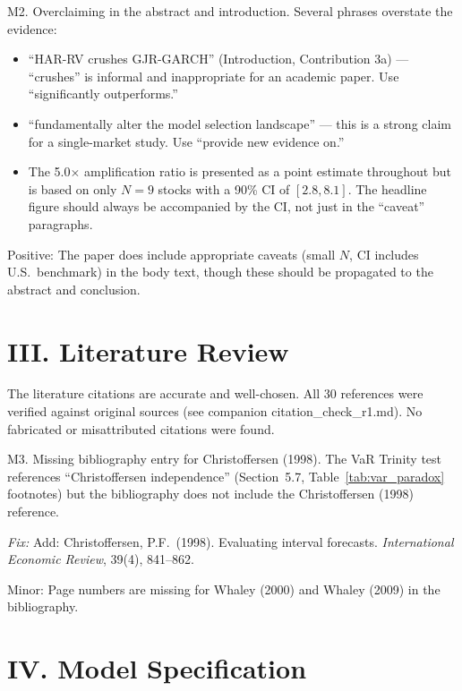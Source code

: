 \documentclass[12pt,a4paper]{article}
\begin{document}
\textcolor{warncolor}{M2. Overclaiming in the abstract and introduction.} Several phrases overstate the evidence:
\begin{itemize}[nosep]
\item ``HAR-RV crushes GJR-GARCH'' (Introduction, Contribution 3a) --- ``crushes'' is informal and inappropriate for an academic paper. Use ``significantly outperforms.''
\item ``fundamentally alter the model selection landscape'' --- this is a strong claim for a single-market study. Use ``provide new evidence on.''
\item The 5.0$\times$ amplification ratio is presented as a point estimate throughout but is based on only $N=9$ stocks with a 90\% CI of $[2.8, 8.1]$. The headline figure should always be accompanied by the CI, not just in the ``caveat'' paragraphs.
\end{itemize}

\textcolor{okgreen}{Positive:} The paper does include appropriate caveats (small $N$, CI includes U.S.\ benchmark) in the body text, though these should be propagated to the abstract and conclusion.


\section*{III. Literature Review}

The literature citations are accurate and well-chosen. All 30 references were verified against original sources (see companion citation\_check\_r1.md). No fabricated or misattributed citations were found.

\textcolor{warncolor}{M3. Missing bibliography entry for Christoffersen (1998).} The VaR Trinity test references ``Christoffersen independence'' (Section~5.7, Table~\ref{tab:var_paradox} footnotes) but the bibliography does not include the Christoffersen (1998) reference.

\textit{Fix:} Add: Christoffersen, P.F.\ (1998). Evaluating interval forecasts. \textit{International Economic Review}, 39(4), 841--862.

Minor: Page numbers are missing for Whaley (2000) and Whaley (2009) in the bibliography.


\section*{IV. Model Specification}
\end{document}
